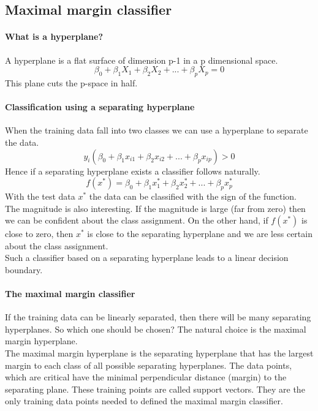 \documentclass[../document.tex]{subfiles}
\begin{document}
	\subsection{Maximal margin classifier}
	\paragraph{What is a hyperplane?}
	A hyperplane is a flat surface of dimension p-1 in a p dimensional space.
	\begin{equation}
		\beta_{0}+\beta_{1}X_{1}+\beta_{2}X_{2}+...+\beta_{p}X_{p}=0
	\end{equation}
	This plane cuts the p-space in half.
	\paragraph{Classification using a separating hyperplane}
	When the training data fall into two classes we can use a hyperplane to separate the data.
	\begin{equation}
		y_{i}(\beta_{0}+\beta_{1}x_{i1}+\beta_{2}x_{i2}+...+\beta_{p}x_{ip}) > 0
	\end{equation}
	Hence if a separating hyperplane exists a classifier follows naturally.
	\begin{equation}
		f(x^*)=\beta_{0}+\beta_{1}x_{1}^*+\beta_{2}x_{2}^*+...+\beta_{p}x_{p}^*
	\end{equation}
	With the test data \(x^*\) the data can be classified with the sign of the function. The magnitude is also interesting. If the magnitude is large (far from zero) then we can be confident about the class assignment. On the other hand, if \(f(x^*)\) is close to zero, then \(x^*\) is close to the separating hyperplane and we are less certain about the class assignment.\\
	Such a classifier based on a separating hyperplane leads to a linear decision boundary.
	\paragraph{The maximal margin classifier}
	If the training data can be linearly separated, then there will be many separating hyperplanes. So which one should be chosen? The natural choice is the maximal margin hyperplane.\\
	The maximal margin hyperplane is the separating hyperplane that has the largest margin to each class of all possible separating hyperplanes. The data points, which are critical have the minimal perpendicular distance (margin) to the separating plane. These training points are called support vectors. They are the only training data points needed to defined the maximal margin classifier.
\end{document}
